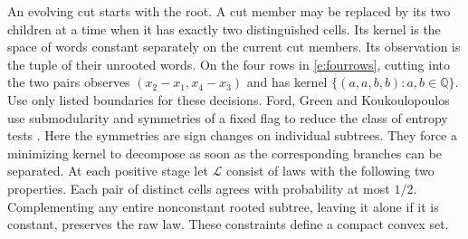 \documentclass[11pt]{article}
\numberwithin{equation}{section}
\newcommand{\Q}{\mathbb Q}
\begin{document}
An evolving cut starts with the root. A cut member may be replaced
by its two children at a time when it has exactly two distinguished
cells. Its kernel is the space of words constant separately on
the current cut members. Its observation is the tuple of their
unrooted words. On the four rows in \eqref{e:fourrows}, cutting
into the two pairs observes $(x_2-x_1,x_4-x_3)$ and has kernel
$\{(a,a,b,b):a,b\in\Q\}$. Use only listed boundaries for these
decisions. Ford, Green and Koukoulopoulos use submodularity and
symmetries of a fixed flag to reduce the class of entropy tests
\cite[Section~8]{fgk}. Here the symmetries are sign changes on
individual subtrees. They force a minimizing kernel to decompose
as soon as the corresponding branches can be separated.
At each positive stage let $\mathcal L$ consist of laws with the
following two properties. Each pair of distinct cells agrees with
probability at most $1/2$. Complementing any entire nonconstant
rooted subtree, leaving it alone if it is constant, preserves
the raw law. These constraints define a compact convex set.
\end{document}
